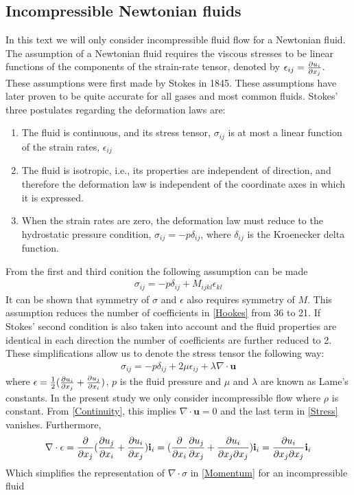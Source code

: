 \subsection{Incompressible Newtonian fluids}
In this text we will only consider incompressible fluid flow for a Newtonian fluid. 
The assumption of a Newtonian fluid requires the viscous stresses to be linear functions of the components of the strain-rate tensor, denoted by $\epsilon_{ij} = \frac{\partial u_i}{\partial x_j}$. These assumptions were first made by Stokes in 1845. These assumptions have later proven to be quite accurate for all gases and most common fluids. Stokes' three postulates regarding the deformation laws are: \cite{White}
\begin{enumerate}
\item The fluid is continuous, and its stress tensor, $\sigma_{ij}$ is at most a linear function of the strain rates, $\epsilon_{ij}$ 
\item The fluid is isotropic, i.e., its properties are independent of direction, and therefore the deformation law is independent of the coordinate axes in which it is expressed. 
\item When the strain rates are zero, the deformation law must reduce to the hydrostatic pressure condition, $\sigma_{ij} = -p\delta_{ij}$, where $\delta_{ij}$ is the Kroenecker delta function. 
\end{enumerate}


From the first and third conition the following assumption can be made
\begin{align}
\sigma_{ij} = -p\delta_{ij} + M_{ijkl}\epsilon_{kl} \label{Hookes}
\end{align}
It can be shown that symmetry of $\sigma$ and $\epsilon$ also requires symmetry of $M$. This assumption reduces the number of coefficients in \eqref{Hookes} from 36 to 21. If Stokes' second condition is also taken into account and the fluid properties are identical in each direction the number of coefficients are further reduced to 2. These simplifications allow us to denote the stress tensor the following way:
\begin{align}
\sigma_{ij} = -p\delta_{ij} + 2\mu\epsilon_{ij} + \lambda \nabla \cdot \mathbf{u} \label{Stress}
\end{align}
where $\epsilon = \frac{1}{2}(\frac{\partial u_i}{\partial x_j} + \frac{\partial u_j}{\partial x_i})$, $p$ is the fluid pressure and $\mu$ and $\lambda$ are known as Lame's constants. In the present study we only consider incompressible flow where $\rho$ is constant. From \eqref{Continuity}, this implies $\nabla \cdot \mathbf{u} = 0$ and the last term in \eqref{Stress} vanishes. Furthermore, 
\begin{align*}
\nabla \cdot \epsilon = \frac{\partial }{\partial x_j}(\frac{\partial u_j}{\partial x_i} + \frac{\partial u_i}{\partial x_j})\mathbf{i}_i = (\frac{\partial }{\partial x_i}\frac{\partial u_j}{\partial x_j} + \frac{\partial u_i}{\partial x_j \partial x_j})\mathbf{i}_i = \frac{\partial u_i}{\partial x_j \partial x_j} \mathbf{i}_i
\end{align*}
Which simplifies the representation of $\nabla \cdot \sigma$ in \eqref{Momentum} for an incompressible fluid

